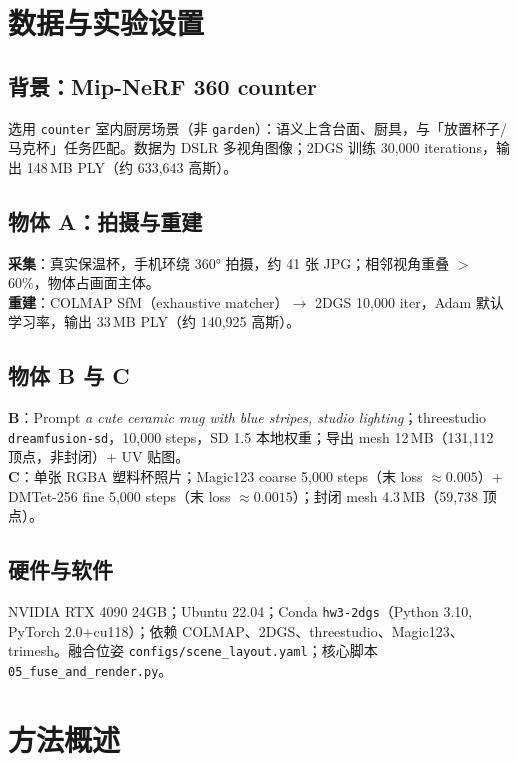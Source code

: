 \documentclass[11pt]{article}
\begin{document}
\section{数据与实验设置}

\subsection{背景：Mip-NeRF 360 counter}
选用 \texttt{counter} 室内厨房场景（非 \texttt{garden}）：语义上含台面、厨具，与「放置杯子/马克杯」任务匹配。数据为 DSLR 多视角图像；2DGS 训练 30{,}000 iterations，输出 148\,MB PLY（约 633{,}643 高斯）。

\subsection{物体 A：拍摄与重建}
\textbf{采集}：真实保温杯，手机环绕 360° 拍摄，约 41 张 JPG；相邻视角重叠 $>$60\%，物体占画面主体。\\
\textbf{重建}：COLMAP SfM（exhaustive matcher）$\rightarrow$ 2DGS 10{,}000 iter，Adam 默认学习率，输出 33\,MB PLY（约 140{,}925 高斯）。

\subsection{物体 B 与 C}
\textbf{B}：Prompt \emph{a cute ceramic mug with blue stripes, studio lighting}；threestudio \texttt{dreamfusion-sd}，10{,}000 steps，SD 1.5 本地权重；导出 mesh 12\,MB（131{,}112 顶点，非封闭）+ UV 贴图。\\
\textbf{C}：单张 RGBA 塑料杯照片；Magic123 coarse 5{,}000 steps（末 loss $\approx 0.005$）+ DMTet-256 fine 5{,}000 steps（末 loss $\approx 0.0015$）；封闭 mesh 4.3\,MB（59{,}738 顶点）。

\subsection{硬件与软件}
NVIDIA RTX 4090 24GB；Ubuntu 22.04；Conda \texttt{hw3-2dgs}（Python 3.10, PyTorch 2.0+cu118）；依赖 COLMAP、2DGS、threestudio、Magic123、trimesh。融合位姿 \texttt{configs/scene\_layout.yaml}；核心脚本 \texttt{05\_fuse\_and\_render.py}。

\section{方法概述}
\end{document}
